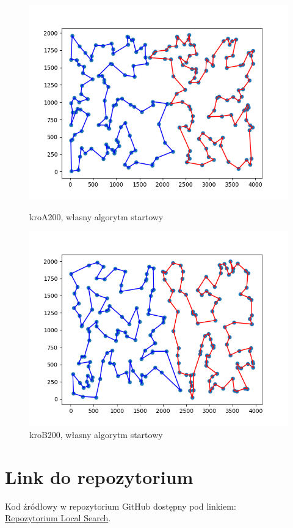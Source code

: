 \documentclass[11pt]{article}
\begin{document}
\begin{figure}[H]
    \vspace{0.5cm}

    \begin{minipage}[t]{0.45\textwidth}
        \centering
        \includegraphics[width=\linewidth]{best_paths/kroA200/traverse_random/split_paths_regret_TSP.png}
        \caption{kroA200, własny algorytm startowy}
    \end{minipage}
    \hfill
    \begin{minipage}[t]{0.45\textwidth}
        \centering
        \includegraphics[width=\linewidth]{best_paths/kroB200/traverse_random/split_paths_regret_TSP.png}
        \caption{kroB200, własny algorytm startowy}
    \end{minipage}
    \label{fig:minipage-random}
\end{figure}

\section{Link do repozytorium}\label{sec:link-do-repo}
Kod źródłowy w repozytorium GitHub dostępny pod linkiem: \\
\href{https://github.com/KotZPolibudy/PUT_IMO/tree/main/Local_search}{Repozytorium Local Search}.
\end{document}
